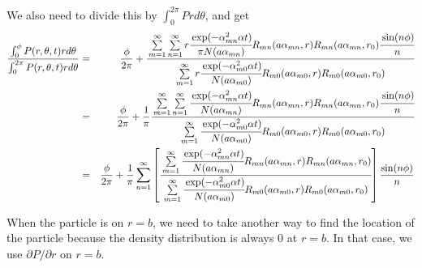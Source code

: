 \documentclass{article}
\begin{document}
%
We also need to divide this by $\int_0^{2\pi} P rd\theta$, and get
%
\begin{eqnarray}
    \frac{\int_0^{\phi} P(r, \theta, t) rd\theta}
         {\int_0^{2\pi} P(r, \theta, t) rd\theta}
    &=& \frac{\phi}{2\pi} +
    \cfrac{
        \sum\limits_{m=1}^{\infty}\sum\limits_{n=1}^{\infty}
        r\cfrac{\exp(-\alpha_{mn}^2\alpha t)}{\pi N(a\alpha_{mn})}
        R_{mn}(a\alpha_{mn}, r) R_{mn}(a\alpha_{mn}, r_0) \cfrac{\sin(n\phi)}{n}
    }{
        \sum\limits_{m=1}^{\infty}
        r\cfrac{\exp(-\alpha_{m0}^2\alpha t)}{N(a\alpha_{m0})}
        R_{m0}(a\alpha_{m0}, r) R_{m0}(a\alpha_{m0}, r_0)
    }
\nonumber\\
    &=& \frac{\phi}{2\pi} + \frac{1}{\pi}
    \cfrac{
        \sum\limits_{m=1}^{\infty}\sum\limits_{n=1}^{\infty}
        \cfrac{\exp(-\alpha_{mn}^2\alpha t)}{N(a\alpha_{mn})}
        R_{mn}(a\alpha_{mn}, r) R_{mn}(a\alpha_{mn}, r_0) \cfrac{\sin(n\phi)}{n}
    }{
        \sum\limits_{m=1}^{\infty}
        \cfrac{\exp(-\alpha_{m0}^2\alpha t)}{N(a\alpha_{m0})}
        R_{m0}(a\alpha_{m0}, r) R_{m0}(a\alpha_{m0}, r_0)
    }
\nonumber\\
    &=& \frac{\phi}{2\pi} + \frac{1}{\pi}\sum_{n=1}^{\infty}\left[
    \cfrac{
        \sum\limits_{m=1}^{\infty}
        \cfrac{\exp(-\alpha_{mn}^2\alpha t)}{N(a\alpha_{mn})}
        R_{mn}(a\alpha_{mn}, r) R_{mn}(a\alpha_{mn}, r_0)
    }{
        \sum\limits_{m=1}^{\infty}
        \cfrac{\exp(-\alpha_{m0}^2\alpha t)}{N(a\alpha_{m0})}
        R_{m0}(a\alpha_{m0}, r) R_{m0}(a\alpha_{m0}, r_0)
    }
    \right] \frac{\sin(n\phi)}{n}
\end{eqnarray}

When the particle is on $r=b$, we need to take another way to find the location
of the particle because the density distribution is always 0 at $r=b$.
In that case, we use $\partial P / \partial r$ on $r=b$.
\end{document}
